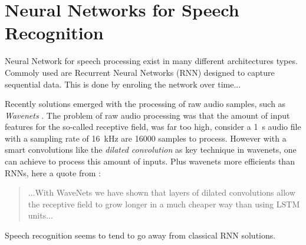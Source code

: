 
\section{Neural Networks for Speech Recognition}\label{sec:prev_nn_speech}
Neural Network for speech processing exist in many different architectures types.
Commoly used are Recurrent Neural Networks (RNN) designed to capture sequential data.
This is done by enroling the network over time...

Recently solutions emerged with the processing of raw audio samples, such as \emph{Wavenets} \cite{Oord2016}.
The problem of raw audio processing was that the amount of input features for the so-called receptive field, was far too high, consider a \SI{1}{\second} audio file with a sampling rate of \SI{16}{\kilo\hertz} are 16000 samples to process.
However with a smart convolutions like the \emph{dilated convolution} as key technique in wavenets, one can achieve to process this amount of inputs.
Plus wavenets more efficients than RNNs, here a quote from \cite{Oord2016}:
\begin{quote}
  ...With WaveNets we have shown that layers of dilated convolutions allow the receptive field to grow longer in a much cheaper way than using LSTM units...
\end{quote}

Speech recognition seems to tend to go away from classical RNN solutions.